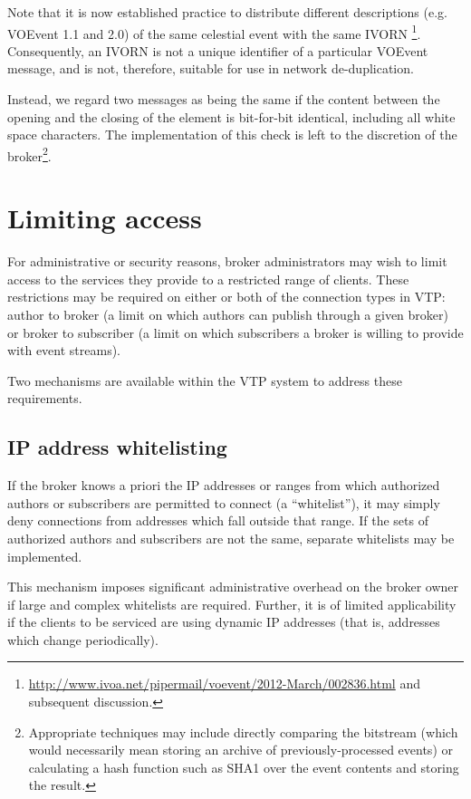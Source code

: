 \documentclass[a4paper,11pt]{ivoa}
\begin{document}
Note that it is now established practice to distribute different descriptions
(e.g. VOEvent 1.1 and 2.0) of the same celestial event with the same IVORN
\footnote{\url{http://www.ivoa.net/pipermail/voevent/2012-March/002836.html}
and subsequent discussion.}. Consequently, an IVORN is not a unique
identifier of a particular VOEvent message, and is not, therefore,
suitable for use in network de-duplication.

Instead, we regard two messages as being the same if the content between the
opening \xmlel{<} and the closing \xmlel{>} of the 
element is bit-for-bit identical, including all white space characters. The
implementation of this check is left to the discretion of the broker\footnote{
Appropriate techniques may include directly comparing the bitstream (which
would necessarily mean storing an archive of previously-processed events) or
calculating a hash function such as SHA1 \citep{Eastlake:2001} over the event
contents and storing the result.}.

\section{Limiting access}
\label{sec:limit}

For administrative or security reasons, broker administrators may wish to
limit access to the services they provide to a restricted range of clients.
These restrictions may be required on either or both of the connection types
in VTP: author to broker (a limit on which authors can publish through a given
broker) or broker to subscriber (a limit on which subscribers a broker is
willing to provide with event streams).

Two mechanisms are available within the VTP system to address these
requirements.

\subsection{IP address whitelisting}
\label{sec:limit:whitelist}

If the broker knows a priori the IP addresses or ranges from which authorized
authors or subscribers are permitted to connect (a ``whitelist''), it may
simply deny connections from addresses which fall outside that range. If the
sets of authorized authors and subscribers are not the same, separate
whitelists may be implemented.

This mechanism imposes significant administrative overhead on the broker owner
if large and complex whitelists are required. Further, it is of limited
applicability if the clients to be serviced are using dynamic IP addresses
(that is, addresses which change periodically).
\end{document}
